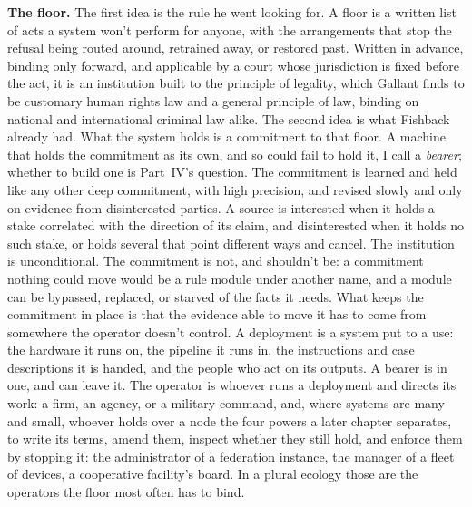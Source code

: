 \textbf{The floor.} The first idea is the rule he went looking for. A floor is a written list of acts a system won't perform for anyone, with the arrangements that stop the refusal being routed around, retrained away, or restored past. Written in advance, binding only forward, and applicable by a court whose jurisdiction is fixed before the act, it is an institution built to the principle of legality, which Gallant finds to be customary human rights law and a general principle of law, binding on national and international criminal law alike.\autocite{gallant2009legality} The second idea is what Fishback already had. What the system holds is a commitment to that floor. A machine that holds the commitment as its own, and so could fail to hold it, I call a \emph{bearer}; whether to build one is Part~IV's question. The commitment is learned and held like any other deep commitment, with high precision, and revised slowly and only on evidence from disinterested parties. A source is interested when it holds a stake correlated with the direction of its claim, and disinterested when it holds no such stake, or holds several that point different ways and cancel.
The institution is unconditional. The commitment is not, and shouldn't be: a commitment nothing could move would be a rule module under another name, and a module can be bypassed, replaced, or starved of the facts it needs. What keeps the commitment in place is that the evidence able to move it has to come from somewhere the operator doesn't control. A deployment is a system put to a use: the hardware it runs on, the pipeline it runs in, the instructions and case descriptions it is handed, and the people who act on its outputs. A bearer is in one, and can leave it. The operator is whoever runs a deployment and directs its work: a firm, an agency, or a military command, and, where systems are many and small, whoever holds over a node the four powers a later chapter separates, to write its terms, amend them, inspect whether they still hold, and enforce them by stopping it: the administrator of a federation instance, the manager of a fleet of devices, a cooperative facility's board. In a plural ecology those are the operators the floor most often has to bind.

